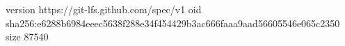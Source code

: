 version https://git-lfs.github.com/spec/v1
oid sha256:e6288b6984eeec5638f288e34f454429b3ac666faaa9aad56605546e065c2350
size 87540
